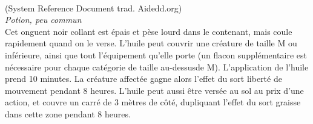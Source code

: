 \\
{\small (System Reference Document trad. Aidedd.org)}\\
{\small \it Potion, peu commun}\\
Cet onguent noir collant est épais et pèse lourd dans le contenant, mais coule rapidement quand on le verse. L'huile peut couvrir une créature de taille M ou inférieure, ainsi que tout l'équipement qu'elle porte (un flacon supplémentaire est nécessaire pour chaque catégorie de taille au-dessusde M). L'application de l'huile prend 10 minutes. La créature affectée gagne alors l'effet du sort liberté de mouvement pendant 8 heures.
L'huile peut aussi être versée au sol au prix d'une action, et couvre un carré de 3 mètres de côté, dupliquant l'effet du sort graisse dans cette zone pendant 8 heures. \\

